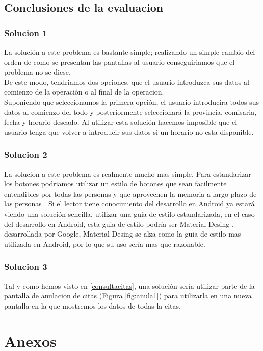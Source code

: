 \documentclass[a4paper,11pt]{article}
\begin{document}
\subsection{Conclusiones de la evaluacion}
\subsubsection{Solucion 1}\label{solucion1}
La solución a este problema es bastante simple; realizando un simple cambio del orden de como se presentan las pantallas al usuario conseguiriamos que el problema no se diese.\\
De este modo, tendriamos dos opciones, que el usuario introduzca sus datos al comienzo de la operación o al final de la operacion. \\
Suponiendo que seleccionamos la primera opción, el usuario introducira todos sus datos al comienzo del todo y posteriormente seleccionará la provincia, comisaria, fecha y horario deseado. Al utilizar esta solución hacemos imposible que el usuario tenga que volver a introducir sus datos si un horario no esta disponible.

\subsubsection{Solucion 2}\label{solucion2}
La solucion a este problema es realmente mucho mas simple. Para estandarizar los botones podriamos utilizar un estilo de botones que sean facilmente entendibles por todas las personas y que aprovechen la memoria a largo plazo de las personas \cite{diapTema2}. Si el lector tiene conocimiento del desarrollo en Android ya estará viendo una solución sencilla, utilizar una guia de estilo estandarizada, en el caso del desarrollo en Android, esta guia de estilo podría ser Material Desing \cite{materialdesing}, desarrollada por Google, Material Desing se alza como la guia de estilo mas utilizada en Android, por lo que su uso sería mas que razonable.

\subsubsection{Solucion 3}
Tal y como hemos visto en \ref{consultacitas}, una solución sería utilizar parte de la pantalla de anulacion de citas (Figura \ref{fig:anula1}) para utilizarla en una nueva pantalla en la que mostremos los datos de todas la citas.

\newpage
\section{Anexos}
\end{document}
